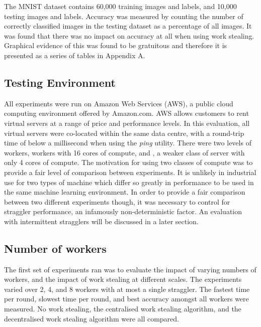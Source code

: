 \documentclass[12pt]{article}
\begin{document}
\newline
\newline
The MNIST dataset contains 60,000 training images and labels, and 10,000 testing images and labels. Accuracy was measured by counting the number of correctly classified images in the testing dataset as a percentage of all images.
\newline
\newline
It was found that there was no impact on accuracy at all when using work stealing. Graphical evidence of this was found to be gratuitous and therefore it is presented as a series of tables in Appendix A. 

\subsection{Testing Environment}
All experiments were run on Amazon Web Services (AWS), a public cloud computing environment offered by Amazon.com. AWS allows customers to rent virtual servers at a range of price and performance levels. In this evaluation, all virtual servers were co-located within the same data centre, with a round-trip time of below a millisecond when using the \textit{ping} utility. There were two levels of workers,  workers with 16 cores of compute, and , a weaker class of server with only 4 cores of compute. The motivation for using two classes of compute was to provide a fair level of comparison between experiments. It is unlikely in industrial use for two types of machine which differ so greatly in performance to be used in the same machine learning environment. In order to provide a fair comparison between two different experiments though, it was necessary to control for straggler performance, an infamously non-deterministic factor. An evaluation with intermittent stragglers will be discussed in a later section.

\subsection{Number of workers}
The first set of experiments ran was to evaluate the impact of varying numbers of workers, and the impact of work stealing at different scales. The experiments varied over 2, 4, and 8 workers with at most a single straggler. The fastest time per round, slowest time per round, and best accuracy amongst all workers were measured. No work stealing, the centralised work stealing algorithm, and the decentralised work stealing algorithm were all compared.
\newline
\newline
\end{document}
